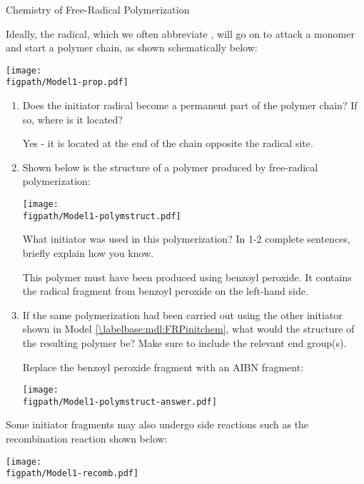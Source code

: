 \begin{activity}{Chemistry of Free-Radical Polymerization}
\begin{ctqs}
	\question Ideally, the radical, which we often abbreviate , will go on to attack a monomer and start a polymer chain, as shown schematically below:
	
			\centerline{\texttt{[image: \\figpath/Model1-prop.pdf]}}
	
		\begin{enumerate}
			\item Does the initiator radical become a permanent part of the polymer chain?  If so, where is it located?
	
				\begin{solution}[1in]{}
					Yes - it is located at the end of the chain opposite the radical site.
				\end{solution}
			
			 \item Shown below is the structure of a polymer produced by free-radical polymerization:
	
			\centerline{\texttt{[image: \\figpath/Model1-polymstruct.pdf]}}
	
			What initiator was used in this polymerization?  In 1-2 complete sentences, briefly explain how you know.
	
				\begin{solution}[1.75in]{}
					This polymer must have been produced using benzoyl peroxide.  It contains the radical fragment from benzoyl peroxide on the left-hand side.
				\end{solution}
			
			\item If the same polymerization had been carried out using the other initiator shown in Model \ref{\labelbase:mdl:FRPinitchem}, what would the structure of the resulting polymer be?  Make sure to include the relevant end group(s).
	
				\begin{solution}[2in]{}
					Replace the benzoyl peroxide fragment with an AIBN fragment:
					
			\centerline{\texttt{[image: \\figpath/Model1-polymstruct-answer.pdf]}}
			
				\end{solution}
				
		\end{enumerate}
		
	\question Some initiator fragments may also undergo side reactions such as the recombination reaction shown below:
	
			\centerline{\texttt{[image: \\figpath/Model1-recomb.pdf]}}
			

\end{ctqs}
\end{activity}
